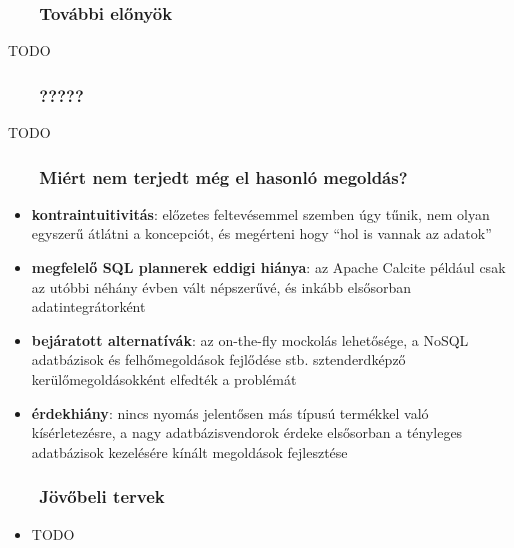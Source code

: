\documentclass[
]{beamer}
\newcommand{\slidetitle}[2]{\frametitle{{\small #1 ~ \ding{226} ~ } \normalsize \textbf{#2} }}
\begin{document}
\begin{frame}
    \slidetitle{\sectionshorttitle}{További előnyök}
    
    TODO
\end{frame}

\begin{frame}
    \slidetitle{\sectionshorttitle}{?????}
    
    TODO
\end{frame}

\begin{frame}
    \slidetitle{\sectionshorttitle}{Miért nem terjedt még el hasonló megoldás?}

    \begin{itemize}
        \setlength\itemsep{1em}
        \pause \item \textbf{kontraintuitivitás}:
            előzetes feltevésemmel szemben úgy tűnik, nem olyan egyszerű átlátni a koncepciót,
            és megérteni hogy ``hol is vannak az adatok''
        \pause \item \textbf{megfelelő SQL plannerek eddigi hiánya}:
            az Apache Calcite például csak az utóbbi néhány évben vált népszerűvé,
            és inkább elsősorban adatintegrátorként
        \pause \item \textbf{bejáratott alternatívák}:
            az on-the-fly mockolás lehetősége,
            a NoSQL adatbázisok és felhőmegoldások fejlődése stb.
            sztenderdképző kerülőmegoldásokként elfedték a problémát
        \pause \item \textbf{érdekhiány}:
            nincs nyomás jelentősen más típusú termékkel való kísérletezésre,
            a nagy adatbázisvendorok érdeke elsősorban
            a tényleges adatbázisok kezelésére kínált megoldások fejlesztése
    \end{itemize}
\end{frame}

\begin{frame}
    \slidetitle{\sectionshorttitle}{Jövőbeli tervek}

    \begin{itemize}
        \setlength\itemsep{1em}
        
        \item TODO
    \end{itemize}
\end{frame}
        
\end{document}

